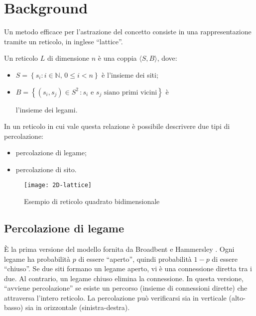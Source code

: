 \section{Background}
\label{sec:background}

Un metodo efficace per l'astrazione del concetto consiste 
in una rappresentazione tramite un reticolo, in inglese ``lattice''.


\begin{definition}[Reticolo]
    Un reticolo $L$ di dimensione $n$ è una coppia $\langle S, B \rangle$, dove:
    \begin{itemize}
        \item $S = \left\{ s_i : i \in \mathbb{N} , \, 0 \leq i < n \right\}$ è l'insieme dei siti;
        \item $B = \left\{ (s_i, s_j) \in S^2 \, : \text{$s_i$ e $s_j$ siano primi vicini} \right\}$ è 
        
        l'insieme dei legami.
    \end{itemize}
\end{definition}

In un reticolo in cui vale questa relazione è possibile descrivere due tipi di percolazione: 
\begin{itemize}
    \item percolazione di legame;
    \item percolazione di sito.
\end{itemize}

\begin{figure}
    \centering
    \texttt{[image: 2D-lattice]}
    \caption{Esempio di reticolo quadrato bidimensionale}
    \label{fig:ex-lattice}
\end{figure}

\subsection*{Percolazione di legame}
È la prima versione del modello fornita da Broadbent e Hammersley \cite{broadbent}.
Ogni legame ha probabilità $p$ di essere ``aperto'', quindi
probabilità $1-p$ di essere ``chiuso''. Se due siti formano un legame aperto, vi è una
connessione diretta tra i due. Al contrario, un legame chiuso elimina la connessione.
In questa versione, ``avviene percolazione'' se esiste un percorso (insieme di connessioni dirette) 
che attraversa l'intero reticolo. La percolazione può verificarsi 
sia in verticale (alto-basso) sia in orizzontale (sinistra-destra).


